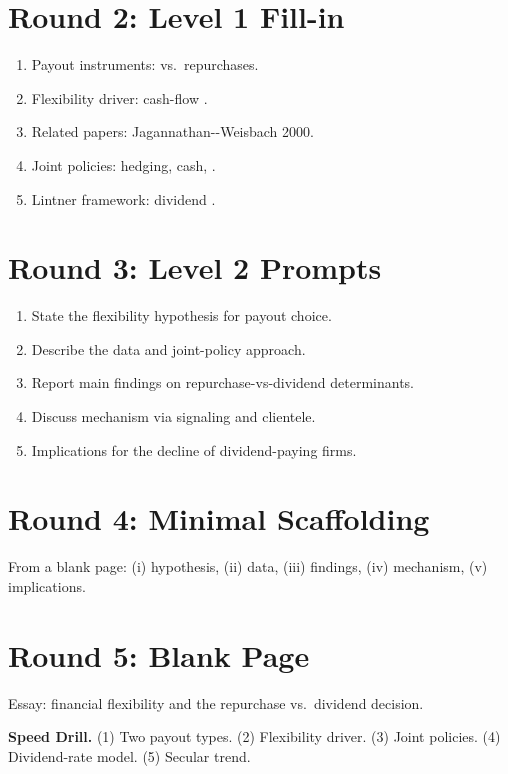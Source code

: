 \documentclass[11pt]{article}
\newcommand{\blank}[1]{\underline{\hspace{#1}}}
\begin{document}
\section*{Round 2: Level 1 Fill-in}
\begin{enumerate}
\item Payout instruments: \blank{2cm} vs.\ repurchases.
\item Flexibility driver: cash-flow \blank{2cm}.
\item Related papers: Jagannathan-\blank{2cm}-Weisbach 2000.
\item Joint policies: hedging, cash, \blank{2cm}.
\item Lintner framework: dividend \blank{2cm}.
\end{enumerate}

\section*{Round 3: Level 2 Prompts}
\begin{enumerate}
\item State the flexibility hypothesis for payout choice.
\item Describe the data and joint-policy approach.
\item Report main findings on repurchase-vs-dividend determinants.
\item Discuss mechanism via signaling and clientele.
\item Implications for the decline of dividend-paying firms.
\end{enumerate}

\section*{Round 4: Minimal Scaffolding}
From a blank page: (i) hypothesis, (ii) data, (iii) findings, (iv) mechanism, (v) implications.

\section*{Round 5: Blank Page}
Essay: financial flexibility and the repurchase vs.\ dividend decision.

\vspace{6pt}
\begin{drillbox}
\textbf{Speed Drill.} (1) Two payout types. (2) Flexibility driver. (3) Joint policies. (4) Dividend-rate model. (5) Secular trend.
\end{drillbox}
\end{document}
